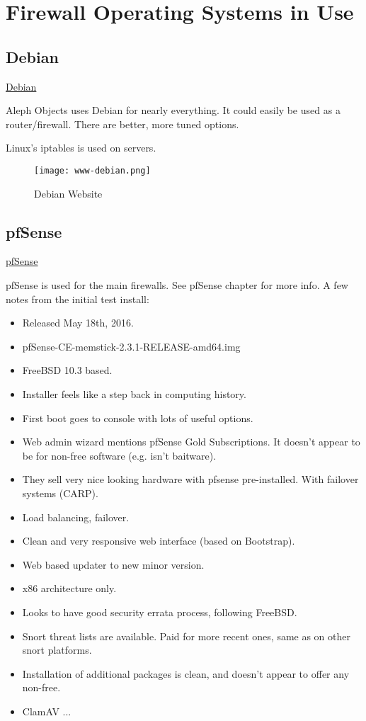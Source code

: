 \section{Firewall Operating Systems in Use}
\subsection{Debian}
 \href{https://www.debian.org/}{Debian}

Aleph Objects uses Debian for nearly everything. It could easily be used as a
router/firewall. There are better, more tuned options.

Linux's iptables is used on servers.

\begin{figure}[h!]
\texttt{[image: www-debian.png]}
 \caption{Debian Website}
 \label{fig:www-debian}
\end{figure}


\subsection{pfSense}
\href{https://www.pfsense.org/}{pfSense}

pfSense is used for the main firewalls. See pfSense chapter for more info.
A few notes from the initial test install:

\begin{itemize}
 \item Released May 18th, 2016.
 \item pfSense-CE-memstick-2.3.1-RELEASE-amd64.img
 \item FreeBSD 10.3 based.
 \item Installer feels like a step back in computing history.
 \item First boot goes to console with lots of useful options.
 \item Web admin wizard mentions pfSense Gold Subscriptions. It doesn't appear to be for non-free software (e.g. isn't baitware).
 \item They sell very nice looking hardware with pfsense pre-installed. With failover systems (CARP).
 \item Load balancing, failover.
 \item Clean and very responsive web interface (based on Bootstrap).
 \item Web based updater to new minor version.
 \item x86 architecture only.
 \item Looks to have good security errata process, following FreeBSD.
 \item Snort threat lists are available. Paid for more recent ones, same as on other snort platforms.
 \item Installation of additional packages is clean, and doesn't appear to offer any non-free.
 \item ClamAV ...
\end{itemize}


